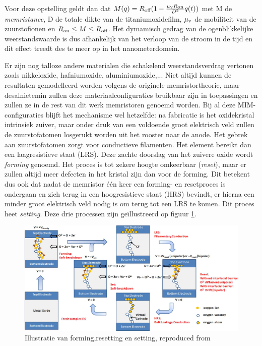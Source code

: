 Voor deze opstelling geldt dan dat $M(q)=R\textsubscript{off}(1-\frac{\mu\textsubscript{v}R\textsubscript{on}}{D^2}q(t))$ met M de \emph{memristance}, D de totale dikte van de titaniumoxidefilm, $\mu\textsubscript{v}$ de mobiliteit van de zuurstofionen en $R\textsubscript{on} \leq M \leq R\textsubscript{off}$. Het dymamisch gedrag van de ogenblikkelijke weerstandswaarde is dus afhankelijk van het verloop van de stroom in de tijd en dit effect treedt des te meer op in het nanometerdomein.

Er zijn nog talloze andere materialen die schakelend weerstandsverdrag vertonen zoals nikkeloxide\cite{Bae04}, hafniumoxide\cite{Che11}, aluminiumoxide\cite{Kim06},... Niet altijd kunnen de resultaten gemodelleerd worden volgens de originele memristortheorie, maar desalnietemin zullen deze materiaalconfiguraties bruikbaar zijn in toepassingen en zullen ze in de rest van dit werk memristoren genoemd worden.
Bij al deze MIM-configuraties blijft het mechanisme wel hetzelfde: na fabricatie is het oxidekristal intrinsiek zuiver, maar onder druk van een voldoende groot elektrisch veld zullen de zuurstofatomen losgerukt worden uit het rooster naar de anode. Het gebrek aan zuurstofatomen zorgt voor conductieve filamenten. Het element bereikt dan een laagresistieve staat (LRS).
Deze zachte doorslag van het zuivere oxide wordt \emph{forming} genoemd. Het proces is tot zekere hoogte omkeerbaar (\emph{reset}), maar er zullen altijd meer defecten in het kristal zijn dan voor de forming. Dit betekent dus ook dat nadat de memristor één keer een forming- en resetproces is ondergaan en zich terug in een hoogresistieve staat (HRS) bevindt, er hierna een minder groot elektrisch veld nodig is om terug tot een LRS te komen. Dit proces heet \emph{setting}. Deze drie processen zijn geïllustreerd op figuur \ref{fig:forming-reset-set}.

\begin{figure}
  \centering
  \includegraphics[scale=0.22]{../fig/hfdstk-cel-forming-reset-set.png}
  \caption[Forming,resetting en setting van een memristor]{Illustratie van forming,resetting en setting, reproduced from\cite{Won12}}
  \label{fig:forming-reset-set}
\end{figure}

